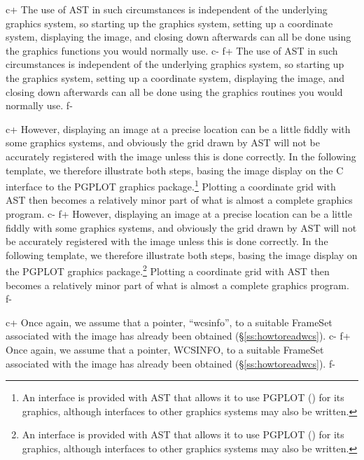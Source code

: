 \documentclass[twoside,11pt]{starlink}
\providecommand{\secref}[1]{\S\ref{#1}}
\begin{document}
c+
The use of AST in such circumstances is independent of the underlying
graphics system, so starting up the graphics system, setting up a
coordinate system, displaying the image, and closing down afterwards
can all be done using the graphics functions you would normally use.
c-
f+
The use of AST in such circumstances is independent of the underlying
graphics system, so starting up the graphics system, setting up a
coordinate system, displaying the image, and closing down afterwards
can all be done using the graphics routines you would normally use.
f-

c+
However, displaying an image at a precise location can be a little
fiddly with some graphics systems, and obviously the grid drawn by AST
will not be accurately registered with the image unless this is done
correctly. In the following template, we therefore illustrate both
steps, basing the image display on the C interface to the PGPLOT
graphics package.\footnote{An interface is provided with AST that
allows it to use PGPLOT () for its graphics,
although interfaces to other graphics systems may also be written.}
Plotting a coordinate grid with AST then becomes a relatively minor
part of what is almost a complete graphics program.
c-
f+
However, displaying an image at a precise location can be a little
fiddly with some graphics systems, and obviously the grid drawn by AST
will not be accurately registered with the image unless this is done
correctly. In the following template, we therefore illustrate both
steps, basing the image display on the PGPLOT graphics
package.\footnote{An interface is provided with AST that allows it to
use PGPLOT () for its graphics, although
interfaces to other graphics systems may also be written.}  Plotting a
coordinate grid with AST then becomes a relatively minor part of what
is almost a complete graphics program.
f-

c+
Once again, we assume that a pointer, ``wcsinfo'', to a suitable
FrameSet associated with the image has already been obtained
(\secref{ss:howtoreadwcs}).
c-
f+
Once again, we assume that a pointer, WCSINFO, to a suitable FrameSet
associated with the image has already been obtained
(\secref{ss:howtoreadwcs}).
f-
\end{document}
